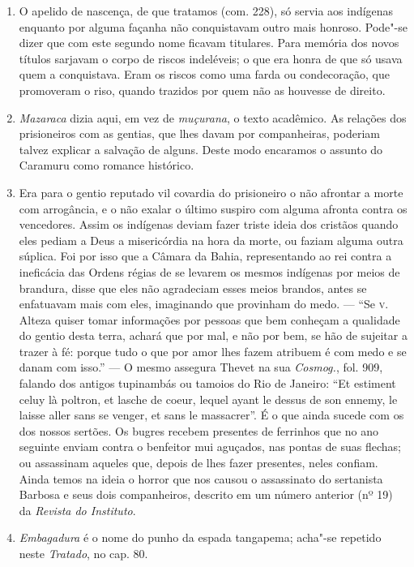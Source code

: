 \begin{enumerate}
\item O apelido de nascença, de que tratamos (com. 228), só servia aos indígenas 
enquanto por alguma façanha não conquistavam outro mais honroso. Pode"-se dizer que 
com este segundo nome ficavam titulares. Para memória dos novos títulos sarjavam o 
corpo de riscos indeléveis; o que era honra de que só usava quem a conquistava. Eram 
os riscos como uma farda ou condecoração, que promoveram o riso, quando trazidos 
por quem não as houvesse de direito.

\item \textit{Mazaraca} dizia aqui, em vez de \textit{muçurana}, o texto acadêmico. As relações dos 
prisioneiros com as gentias, que lhes davam por companheiras, poderiam talvez 
explicar a salvação de alguns. Deste modo encaramos o assunto do Caramuru como 
romance histórico.

\item Era para o gentio reputado vil covardia do prisioneiro o não afrontar a morte com 
arrogância, e o não exalar o último suspiro com alguma afronta contra os vencedores. 
Assim os indígenas deviam fazer triste ideia dos cristãos quando eles pediam a Deus a 
misericórdia na hora da morte, ou faziam alguma outra súplica. Foi por isso que a 
Câmara da Bahia, representando ao rei contra a ineficácia das Ordens régias de se 
levarem os mesmos indígenas por meios de brandura, disse que eles não agradeciam esses meios 
brandos, antes se enfatuavam mais com eles, imaginando que provinham do medo. --- ``Se \textsc{v}. 
Alteza quiser tomar informações por pessoas que bem conheçam a qualidade do gentio desta 
terra, achará que por mal, e não por bem, se hão de sujeitar a trazer à fé: porque tudo o que 
por amor lhes fazem atribuem é com medo e se danam com isso.'' --- O mesmo assegura 
Thevet na sua \textit{Cosmog.}, fol. 909, falando dos antigos tupinambás ou tamoios do Rio de 
Janeiro: ``Et estiment celuy là poltron, et lasche de coeur, lequel ayant le dessus de son 
ennemy, le laisse aller sans se venger, et sans le massacrer''.  É o que ainda sucede com os 
dos nossos sertões. Os bugres recebem presentes de ferrinhos que no ano seguinte enviam 
contra o benfeitor mui aguçados, nas pontas de suas flechas; ou assassinam aqueles que, 
depois de lhes fazer presentes, neles confiam. Ainda temos na ideia o horror que nos causou 
o assassinato do sertanista Barbosa e seus dois companheiros, descrito em um número 
anterior (nº 19) da \textit{Revista do Instituto}.

\item \textit{Embagadura} é o nome do punho da espada tangapema; acha"-se repetido neste \textit{Tratado}, no cap. 80.


\end{enumerate}
